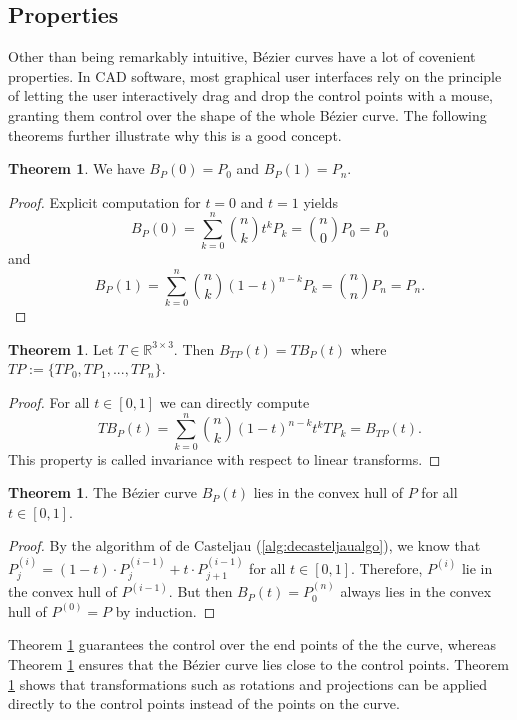\documentclass[a4paper, 11pt]{report}
\theoremstyle{definition}
\newtheorem{theorem}[definition]{Theorem}
\begin{document}
\subsection{Properties}
	Other than being remarkably intuitive, Bézier curves have a lot of covenient properties. In CAD software, most graphical user interfaces rely on the principle of letting the user interactively drag and drop the control points with a mouse, granting them control over the shape of the whole Bézier curve. The following theorems further illustrate why this is a good concept.

	\begin{theorem}\label{thm:bezierendpoints}
		We have $B_P(0) = P_0$ and $B_P(1) = P_n$.
	\end{theorem}
	\begin{proof}
		Explicit computation for $t=0$ and $t=1$ yields
			$$B_P(0) = \sum_{k=0}^n \binom{n}{k} t^k P_k = \binom{n}{0} P_0 = P_0$$
		and
			$$B_P(1) = \sum_{k=0}^n \binom{n}{k} (1-t)^{n-k} P_k = \binom{n}{n} P_n = P_n.$$
	\end{proof}

	\begin{theorem}\label{thm:bezieraffinetransform}
		Let $T \in \mathbb{R}^{3 \times 3}$. Then $B_{TP}(t) = TB_P(t)$ where $TP := \{TP_0, TP_1, ..., TP_n\}$.
	\end{theorem}
	\begin{proof}
		For all $t \in [0, 1]$ we can directly compute
			$$TB_P(t) = \sum_{k=0}^n \binom{n}{k} (1-t)^{n-k}t^k TP_k = B_{TP}(t).$$
		This property is called invariance with respect to linear transforms.
	\end{proof}

	\begin{theorem}\label{thm:bezierconvexhull}
		The Bézier curve $B_P(t)$ lies in the convex hull of $P$ for all $t \in [0,1]$.
	\end{theorem}
	\begin{proof}
		By the algorithm of de Casteljau (\ref{alg:decasteljaualgo}), we know that $P^{(i)}_j = (1-t) \cdot P^{(i-1)}_j + t \cdot P^{(i-1)}_{j+1}$ for all $t \in [0, 1]$. Therefore, $P^{(i)}$ lie in the convex hull of $P^{(i-1)}$. But then $B_P(t) = P^{(n)}_0$ always lies in the convex hull of $P^{(0)} = P$ by induction.
	\end{proof}

	Theorem \ref{thm:bezierendpoints} guarantees the control over the end points of the the curve, whereas Theorem \ref{thm:bezierconvexhull} ensures that the Bézier curve lies close to the control points. Theorem \ref{thm:bezieraffinetransform} shows that transformations such as rotations and projections can be applied directly to the control points instead of the points on the curve.
\end{document}
